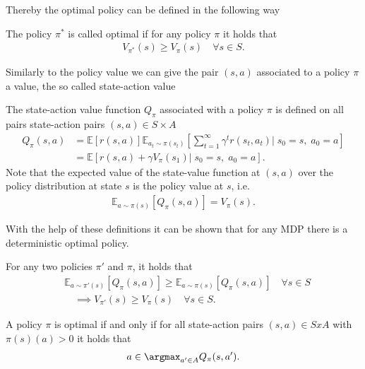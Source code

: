 Thereby the optimal policy can be defined in the following way
\begin{definition}
    The policy $\pi^{*}$ is called optimal if for any policy $\pi$ it
    holds that
    \begin{align}
        V_{\pi^{*}}(s) \ge V_\pi(s) \quad \forall s \in S.
    \end{align}
\end{definition}
Similarly to the policy value we can give the pair $(s, a)$ associated to a
policy $\pi$ a value, the so called state-action value
\begin{definition}
    The state-action value function $Q_\pi$ associated with a policy $\pi$ is
    defined on all pairs state-action pairs $(s, a) \in S \times A$
    \begin{align}
        Q_\pi(s, a) &= \mathbb{E}[r(s,a)]
        \mathbb{E}_{a_t\sim\pi(s_t)}\left[ \sum_{t=1}^{\infty}\gamma^{t}
            r(s_t, a_t)\Bigg |\; s_0 = s,\; a_0 = a \right] \\
        \nonumber
            &= \mathbb{E}\left[r(s,a) + \gamma V_\pi(s_1)\Big| \;s_0=s,\;
            a_0=a   \right].
    \end{align}
    Note that the expected value of the state-value function at $(s, a)$ over the policy
    distribution at state $s$ is the policy value at $s$, i.e.
    \begin{align}
        \mathbb{E}_{a\sim\pi(s)}\left[Q_\pi(s, a)\right] = V_\pi(s).
    \end{align}
\end{definition}
With the help of these definitions it can be shown that for any MDP there is
a deterministic optimal policy.
\begin{theorem}
    For any two policies $\pi'$ and $\pi$, it holds that
    \begin{align}
         &\mathbb{E}_{a\sim\pi'(s)}\left[Q_\pi(s, a)\right]
        \ge \mathbb{E}_{a\sim\pi(s)}\left[Q_\pi(s, a)\right]  \quad \forall s \in S
        \\
         &\quad \implies  V_{\pi'}(s) \ge V_\pi (s) \quad
         \forall s \in S\nonumber.
    \end{align}
\end{theorem}
\begin{theorem}
    A policy $\pi$ is optimal if and only if for all state-action pairs
    $(s, a) \in S x A$ with $\pi(s)(a) > 0$ it holds that
    \begin{align}
        a \in \argmax_{a'\in A} Q_\pi(s, a').
    \end{align}
\end{theorem}
